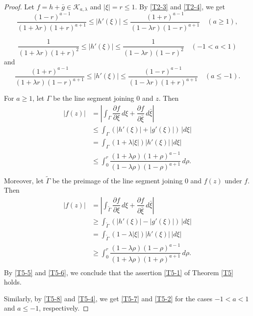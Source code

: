 \documentclass[11pt, reqno]{amsart}
\numberwithin{equation}{section}
\begin{document}
\begin{proof}
Let $f=h+\bar{g}\in\mathcal{K}_{a,\lambda}$ and $|\xi|=r\leq 1$.  By \eqref{T2-3} and \eqref{T2-4}, we get 
\begin{equation}\label{T5-3}
   \dfrac{(1-r)^{a-1}}{(1+\lambda r)(1+r)^{a+1}}\leq|h'(\xi)|\leq \dfrac{(1+r)^{a-1}}{(1-\lambda r)(1-r)^{a+1}}\quad(a\geq 1),
\end{equation}

\begin{equation}\label{T5-8}
\dfrac{1}{(1+\lambda r)(1+r)^{2}} \leq|h'(\xi)|\leq   
     \dfrac{1}{(1-\lambda r)(1-r)^{2}}\quad(-1<a<1)
\end{equation}
and
\begin{equation}\label{T5-4}
\dfrac{(1+r)^{a-1}}{(1+\lambda r)(1-r)^{a+1}} \leq|h'(\xi)|\leq   \dfrac{(1-r)^{a-1}}{(1-\lambda r)(1+r)^{a+1}}\quad(a\leq -1).
\end{equation}

For $a\geq 1$, let $\Gamma$ be the line segment joining $0$ and $z$.
Then 
\begin{equation}\label{T5-5}
    \begin{aligned}
        |f(z)|&=\left|\displaystyle\int_{\Gamma}\dfrac{\partial f}{\partial \xi}\,d\xi+\dfrac{\partial f}{\partial \bar{\xi}}\,d\bar{\xi}\right|\\
        &\leq\displaystyle\int_{\Gamma}\left(|h'(\xi)|+|g'(\xi)|\right)\,|d\xi|\\
        &=\displaystyle\int_{\Gamma}(1+\lambda|\xi|)|h'(\xi)|\,|d\xi|\\
        & \leq\displaystyle\int_{0}^{r}\dfrac{(1+\lambda \rho)(1+\rho)^{a-1}}{(1-\lambda \rho)(1-\rho)^{a+1}}\,d\rho.\\
    \end{aligned}
\end{equation}
Moreover, let $\widetilde{\Gamma}$  be the preimage of the line segment joining $0$ and $f(z)$ under $f$. Then
\begin{equation}\label{T5-6}
    \begin{aligned}
        |f(z)|&=\left|\displaystyle\int_{\widetilde{\Gamma}}\dfrac{\partial f}{\partial \xi}\,d\xi+\dfrac{\partial f}{\partial \bar{\xi}}\,d\bar{\xi}\right|\\
        &\geq\displaystyle\int_{\widetilde\Gamma}\left(|h'(\xi)|-|g'(\xi)|\right)\,|d\xi|\\
        &=\displaystyle\int_{\widetilde\Gamma}(1-\lambda|\xi|)|h'(\xi)|\,|d\xi|\\
        &\geq\displaystyle\int_{0}^{r}\dfrac{(1-\lambda \rho)(1-\rho)^{a-1}}{(1+\lambda \rho)(1+\rho)^{a+1}}\,d\rho.\\
    \end{aligned}
\end{equation}
By \eqref{T5-5} and \eqref{T5-6}, we conclude that the assertion \eqref{T5-1} of Theorem \ref{T5} holds. 

Similarly, by
\eqref{T5-8} and \eqref{T5-4}, we get \eqref{T5-7} and \eqref{T5-2} for the cases $-1<a<1$ and $a\leq -1$, respectively.
\end{proof}
\end{document}
